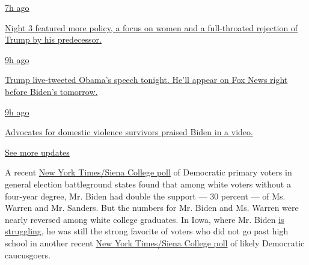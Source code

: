 \href{https://www.nytimes3xbfgragh.onion/live/2020/08/19/us/dnc-convention-election?action=click\&pgtype=Article\&state=default\&region=MAIN_CONTENT_1\&context=storylines_live_updates\#night-3-featured-more-policy-a-focus-on-women-and-a-full-throated-rejection-of-trump-by-his-predecessor}{7h
ago}

\href{https://www.nytimes3xbfgragh.onion/live/2020/08/19/us/dnc-convention-election?action=click\&pgtype=Article\&state=default\&region=MAIN_CONTENT_1\&context=storylines_live_updates\#night-3-featured-more-policy-a-focus-on-women-and-a-full-throated-rejection-of-trump-by-his-predecessor}{Night
3 featured more policy, a focus on women and a full-throated rejection
of Trump by his predecessor.}

\href{https://www.nytimes3xbfgragh.onion/live/2020/08/19/us/dnc-convention-election?action=click\&pgtype=Article\&state=default\&region=MAIN_CONTENT_1\&context=storylines_live_updates\#trump-live-tweeted-obamas-speech-tonight-hell-appear-on-fox-news-right-before-bidens-tomorrow}{9h
ago}

\href{https://www.nytimes3xbfgragh.onion/live/2020/08/19/us/dnc-convention-election?action=click\&pgtype=Article\&state=default\&region=MAIN_CONTENT_1\&context=storylines_live_updates\#trump-live-tweeted-obamas-speech-tonight-hell-appear-on-fox-news-right-before-bidens-tomorrow}{Trump
live-tweeted Obama's speech tonight. He'll appear on Fox News right
before Biden's tomorrow.}

\href{https://www.nytimes3xbfgragh.onion/live/2020/08/19/us/dnc-convention-election?action=click\&pgtype=Article\&state=default\&region=MAIN_CONTENT_1\&context=storylines_live_updates\#advocates-for-domestic-violence-survivors-praised-biden-in-a-video}{9h
ago}

\href{https://www.nytimes3xbfgragh.onion/live/2020/08/19/us/dnc-convention-election?action=click\&pgtype=Article\&state=default\&region=MAIN_CONTENT_1\&context=storylines_live_updates\#advocates-for-domestic-violence-survivors-praised-biden-in-a-video}{Advocates
for domestic violence survivors praised Biden in a video.}

\href{https://www.nytimes3xbfgragh.onion/live/2020/08/19/us/dnc-convention-election?action=click\&pgtype=Article\&state=default\&region=MAIN_CONTENT_1\&context=storylines_live_updates}{See
more updates}

A recent
\href{https://www.nytimes3xbfgragh.onion/2019/11/08/us/politics/democrats-poll-moderates-battleground.html}{New
York Times/Siena College poll} of Democratic primary voters in general
election battleground states found that among white voters without a
four-year degree, Mr. Biden had double the support --- 30 percent --- of
Ms. Warren and Mr. Sanders. But the numbers for Mr. Biden and Ms. Warren
were nearly reversed among white college graduates. In Iowa, where Mr.
Biden
\href{https://www.nytimes3xbfgragh.onion/2019/11/01/us/politics/iowa-poll-warren-biden.html}{is
struggling}, he was still the strong favorite of voters who did not go
past high school in another recent
\href{https://www.nytimes3xbfgragh.onion/2019/11/01/us/politics/iowa-poll-warren-biden.html}{New
York Times/Siena College poll} of likely Democratic caucusgoers.

